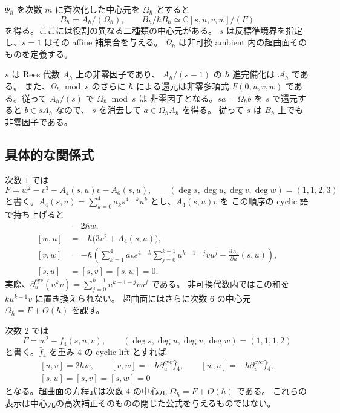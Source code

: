 $\Psi_\hbar$ を次数 $m$ に斉次化した中心元を $\Omega_\hbar$ とすると
\begin{equation}
 B_\hbar=A_\hbar/(\Omega_\hbar),
 \qquad B_\hbar/\hbar B_\hbar\simeq\mathbb C[s,u,v,w]/(F)
 \label{eq:rees-hypersurface}
\end{equation}
を得る。ここには役割の異なる二種類の中心元がある。
$s$ は反標準境界を指定し、$s=1$ はその affine 補集合を与える。
$\Omega_\hbar$ は非可換 ambient 内の超曲面そのものを定義する。

$s$ は Rees 代数 $A_\hbar$ 上の非零因子であり、
$A_\hbar/(s-1)$ の $\hbar$ 進完備化は $\mathcal A_\hbar$ である。
また、$\Omega_\hbar\bmod s$ のさらに $\hbar$ による還元は非零多項式
$F(0,u,v,w)$ である。従って $A_\hbar/(s)$ で $\Omega_\hbar\bmod s$ は
非零因子となる。$sa=\Omega_\hbar b$ を $s$ で還元すると $b\in sA_\hbar$ なので、
$s$ を消去して $a\in\Omega_\hbar A_\hbar$ を得る。
従って $s$ は $B_\hbar$ 上でも非零因子である。

\subsection{具体的な関係式}

次数 $1$ では
\[
 F=w^2-v^3-A_4(s,u)v-A_6(s,u),
 \qquad (\deg s,\deg u,\deg v,\deg w)=(1,1,2,3)
\]
と書く。$A_4(s,u)=\sum_{k=0}^4a_k s^{4-k}u^k$ とし、$A_4(s,u)v$ を
この順序の cyclic 語で持ち上げると
\begin{align}
 [u,v]&=2\hbar w,\label{eq:degree1-uv}\\
 [w,u]&=-\hbar\bigl(3v^2+A_4(s,u)\bigr),\label{eq:degree1-wu}\\
 [v,w]&=-\hbar\left(
    \sum_{k=1}^4 a_k s^{4-k}\sum_{j=0}^{k-1}u^{k-1-j}vu^j
    +\frac{\partial A_6}{\partial u}(s,u)\right),\label{eq:degree1-vw}\\
 [s,u]&=[s,v]=[s,w]=0.\nonumber
\end{align}
実際、$\partial_u^{\mathrm{cyc}}(u^kv)
=\sum_{j=0}^{k-1}u^{k-1-j}vu^j$ である。
非可換代数内ではこの和を $ku^{k-1}v$ に置き換えられない。
超曲面にはさらに次数 $6$ の中心元 $\Omega_\hbar=F+O(\hbar)$ を課す。

次数 $2$ では
\[
 F=w^2-f_4(s,u,v),
 \qquad(\deg s,\deg u,\deg v,\deg w)=(1,1,1,2)
\]
と書く。$\widehat f_4$ を重み $4$ の cyclic lift とすれば
\begin{equation}
 \begin{gathered}
 [u,v]=2\hbar w,\qquad
 [v,w]=-\hbar\partial_u^{\mathrm{cyc}}\widehat f_4,\qquad
 [w,u]=-\hbar\partial_v^{\mathrm{cyc}}\widehat f_4,\\
 [s,u]=[s,v]=[s,w]=0
 \end{gathered}
 \label{eq:degree2-potential-relations}
\end{equation}
となる。超曲面の方程式は次数 $4$ の中心元 $\Omega_\hbar=F+O(\hbar)$ である。
これらの表示は中心元の高次補正そのものの閉じた公式を与えるものではない。

